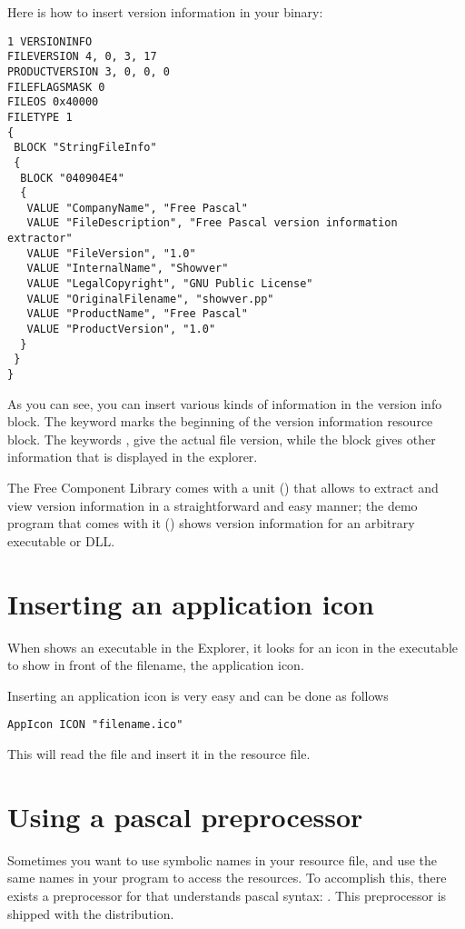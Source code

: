 {Here is how to insert version information in your binary:
\begin{verbatim}
1 VERSIONINFO
FILEVERSION 4, 0, 3, 17
PRODUCTVERSION 3, 0, 0, 0
FILEFLAGSMASK 0
FILEOS 0x40000
FILETYPE 1
{
 BLOCK "StringFileInfo"
 {
  BLOCK "040904E4"
  {
   VALUE "CompanyName", "Free Pascal"
   VALUE "FileDescription", "Free Pascal version information extractor"
   VALUE "FileVersion", "1.0"
   VALUE "InternalName", "Showver"
   VALUE "LegalCopyright", "GNU Public License"
   VALUE "OriginalFilename", "showver.pp"
   VALUE "ProductName", "Free Pascal"
   VALUE "ProductVersion", "1.0"
  }
 }
}
\end{verbatim}
As you can see, you can insert various kinds of information in the version info
block. The keyword  marks the beginning of the version
information resource block. The keywords ,
 give the actual file version, while the block
 gives other information that is displayed in the
explorer.

The Free Component Library comes with a unit () that allows
to extract and view version information in a straightforward and easy manner;
the demo program that comes with it () shows version information
for an arbitrary executable or DLL.

\section{Inserting an application icon}

When \windows shows an executable in the Explorer, it looks for an icon
in the executable to show in front of the filename, the application
icon.

Inserting an application icon is very easy and can be done as follows
\begin{verbatim}
AppIcon ICON "filename.ico"
\end{verbatim}
This will read the file  and insert it in the
resource file.

\section{Using a pascal preprocessor}

Sometimes you want to use symbolic names in your resource file, and
use the same names in your program to access the resources. To accomplish
this, there exists a preprocessor for  that understands pascal
syntax: . This preprocessor is shipped with the \fpc
distribution.

}
